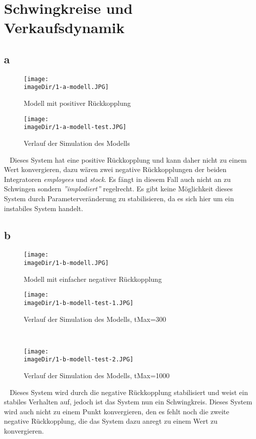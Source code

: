 \section{Schwingkreise und Verkaufsdynamik}

\subsection{a}
\begin{figure}[h]
	\centering
	\texttt{[image: \\imageDir/1-a-modell.JPG]}
	\caption{Modell mit positiver Rückkopplung}
	\label{fig:1-a-modell}
\end{figure}
\begin{figure}[h]
\centering
\texttt{[image: \\imageDir/1-a-modell-test.JPG]}
\caption{Verlauf der Simulation des Modells}
\label{fig:1-a-modell-test}
\end{figure}
\ \newline
Dieses System hat eine positive Rückkopplung und kann daher nicht zu einem Wert konvergieren, dazu wären zwei negative Rückkopplungen der beiden Integratoren \emph{employees} und \emph{stock}. Es fängt in diesem Fall auch nicht an zu Schwingen sondern \emph{''implodiert''} regelrecht. Es gibt keine Möglichkeit dieses System durch Parameterveränderung zu stabilisieren, da es sich hier um ein instabiles System handelt.
\newpage

\subsection{b}
\begin{figure}[h]
	\centering
	\texttt{[image: \\imageDir/1-b-modell.JPG]}
	\caption{Modell mit einfacher negativer Rückkopplung}
	\label{fig:1-b-modell}
\end{figure}
\begin{figure}[h]
	\centering
	\texttt{[image: \\imageDir/1-b-modell-test-1.JPG]}
	\caption{Verlauf der Simulation des Modells, tMax=300}
	\label{fig:1-b-modell-test-1}
\end{figure}
\ \newpage

\begin{figure}[h]
	\centering
	\texttt{[image: \\imageDir/1-b-modell-test-2.JPG]}
	\caption{Verlauf der Simulation des Modells, tMax=1000}
	\label{fig:1-b-modell-test-2}
\end{figure}
\ \newline
Dieses System wird durch die negative Rückkopplung stabilisiert und weist ein stabiles Verhalten auf, jedoch ist das System nun ein Schwingkreis. Dieses System wird auch nicht zu einem Punkt konvergieren, den es fehlt noch die zweite negative Rückkopplung, die das System dazu anregt zu einem Wert zu konvergieren.

